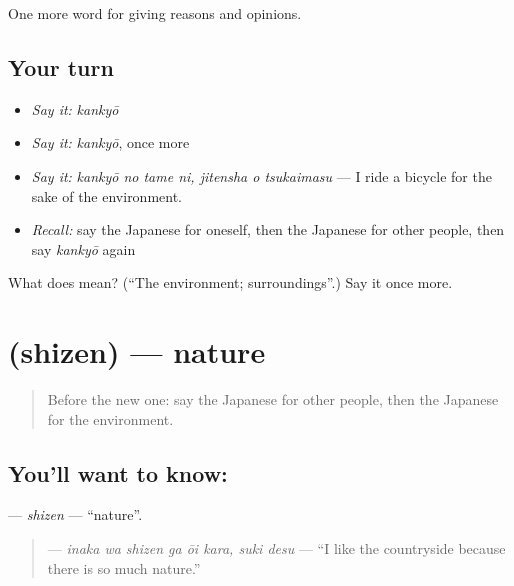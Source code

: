 \begin{grammarlens}[title={What you've built}]
One more word for giving reasons and opinions.
\end{grammarlens}

\subsection*{Your turn}
\begin{itemize}
\raggedright
  \item \emph{Say it:} \emph{kankyō}
  \item \emph{Say it:} \emph{kankyō}, once more
  \item \emph{Say it:} \emph{kankyō no tame ni, jitensha o tsukaimasu} — I ride a bicycle for the sake of the environment.
  \item \emph{Recall:} say the Japanese for oneself, then the Japanese for other people, then say \emph{kankyō} again
\end{itemize}

\begin{tcolorbox}[breakable,colback=teal!4,colframe=teal!35!black,title={Before you move on}]
What does  mean? (\textquotedblleft{}The environment; surroundings\textquotedblright{}.) Say it once more.
\end{tcolorbox}
\section[\texorpdfstring{\ja{しぜん} (shizen)}{しぜん (shizen)}]{ (shizen) — nature}

\label{lesson:JA-C336-shizen}



\begin{quote}
Before the new one: say the Japanese for other people, then the Japanese for the environment.
\end{quote}

\subsection*{You'll want to know: }
\textbf{} — \emph{shizen} — \textquotedblleft{}nature\textquotedblright{}.

\begin{quote}
\textbf{  } — \emph{inaka wa shizen ga ōi kara, suki desu} — \textquotedblleft{}I like the countryside because there is so much nature.\textquotedblright{}
\end{quote}

